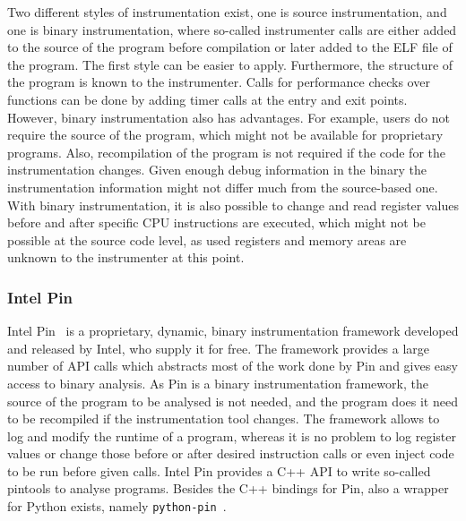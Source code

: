 Two different styles of instrumentation exist, one is source instrumentation,
and one is binary instrumentation, where so-called instrumenter calls are either
added to the source of the program before compilation or later added to the ELF
file of the program. The first style can be easier to apply. Furthermore, the
structure of the program is known to the instrumenter. Calls for performance
checks over functions can be done by adding timer calls at the entry and exit
points. However, binary instrumentation also has advantages. For example, users
do not require the source of the program, which might not be available for
proprietary programs. Also, recompilation of the program is not required if the
code for the instrumentation changes. Given enough debug information in the
binary the instrumentation information might not differ much from the
source-based one. With binary instrumentation, it is also possible to change and
read register values before and after specific CPU instructions are executed,
which might not be possible at the source code level, as used registers and
memory areas are unknown to the instrumenter at this point.

\subsubsection{Intel Pin}

Intel Pin~\cite{pintool} is a proprietary, dynamic, binary instrumentation
framework developed and released by Intel, who supply it for free. The framework
provides a large number of API calls which abstracts most of the work done by
Pin and gives easy access to binary analysis. As Pin is a binary instrumentation
framework, the source of the program to be analysed is not needed, and the
program does it need to be recompiled if the instrumentation tool changes. The
framework allows to log and modify the runtime of a program, whereas it is no
problem to log register values or change those before or after desired
instruction calls or even inject code to be run before given calls. Intel Pin
provides a C++ API to write so-called pintools to analyse programs. Besides the
C++ bindings for Pin, also a wrapper for Python exists, namely
\texttt{python-pin}~\cite{pythonpin}.

